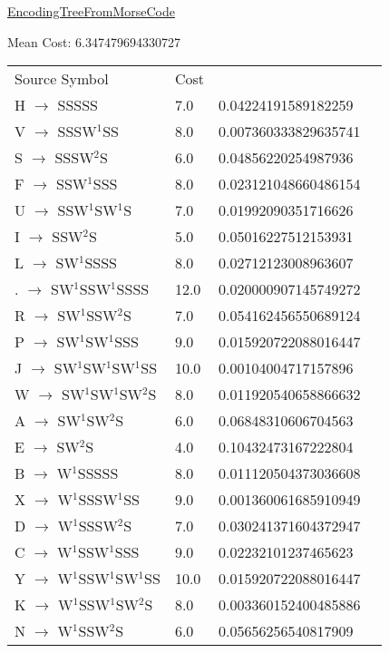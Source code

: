 \documentclass[12pt]{article}
\begin{document}
\noindent \url{EncodingTreeFromMorseCode}



\newpage
\noindent
\noindent Mean Cost: 6.347479694330727\\
\begin{tabular}{l l l l}
Source Symbol	&	Cost\\
H $\rightarrow$ SSSSS	&	7.0	&	0.04224191589182259\\
V $\rightarrow$ SSSW{$^{1}$}SS	&	8.0	&	0.007360333829635741\\
S $\rightarrow$ SSSW{$^{2}$}S	&	6.0	&	0.04856220254987936\\
F $\rightarrow$ SSW{$^{1}$}SSS	&	8.0	&	0.023121048660486154\\
U $\rightarrow$ SSW{$^{1}$}SW{$^{1}$}S	&	7.0	&	0.01992090351716626\\
I $\rightarrow$ SSW{$^{2}$}S	&	5.0	&	0.05016227512153931\\
L $\rightarrow$ SW{$^{1}$}SSSS	&	8.0	&	0.02712123008963607\\
. $\rightarrow$ SW{$^{1}$}SSW{$^{1}$}SSSS	&	12.0	&	0.020000907145749272\\
R $\rightarrow$ SW{$^{1}$}SSW{$^{2}$}S	&	7.0	&	0.054162456550689124\\
P $\rightarrow$ SW{$^{1}$}SW{$^{1}$}SSS	&	9.0	&	0.015920722088016447\\
J $\rightarrow$ SW{$^{1}$}SW{$^{1}$}SW{$^{1}$}SS	&	10.0	&	0.00104004717157896\\
W $\rightarrow$ SW{$^{1}$}SW{$^{1}$}SW{$^{2}$}S	&	8.0	&	0.011920540658866632\\
A $\rightarrow$ SW{$^{1}$}SW{$^{2}$}S	&	6.0	&	0.06848310606704563\\
E $\rightarrow$ SW{$^{2}$}S	&	4.0	&	0.10432473167222804\\
B $\rightarrow$ W{$^{1}$}SSSSS	&	8.0	&	0.011120504373036608\\
X $\rightarrow$ W{$^{1}$}SSSW{$^{1}$}SS	&	9.0	&	0.001360061685910949\\
D $\rightarrow$ W{$^{1}$}SSSW{$^{2}$}S	&	7.0	&	0.030241371604372947\\
C $\rightarrow$ W{$^{1}$}SSW{$^{1}$}SSS	&	9.0	&	0.02232101237465623\\
Y $\rightarrow$ W{$^{1}$}SSW{$^{1}$}SW{$^{1}$}SS	&	10.0	&	0.015920722088016447\\
K $\rightarrow$ W{$^{1}$}SSW{$^{1}$}SW{$^{2}$}S	&	8.0	&	0.003360152400485886\\
N $\rightarrow$ W{$^{1}$}SSW{$^{2}$}S	&	6.0	&	0.05656256540817909\\

\end{tabular}
\end{document}
